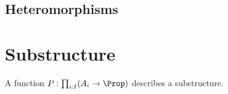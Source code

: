 \subsection{Heteromorphisms}


\section{Substructure}
A function $P:\prod_{i:I}(A_i\to \Prop)$ describes a substructure.
\begin{center}
\end{center}